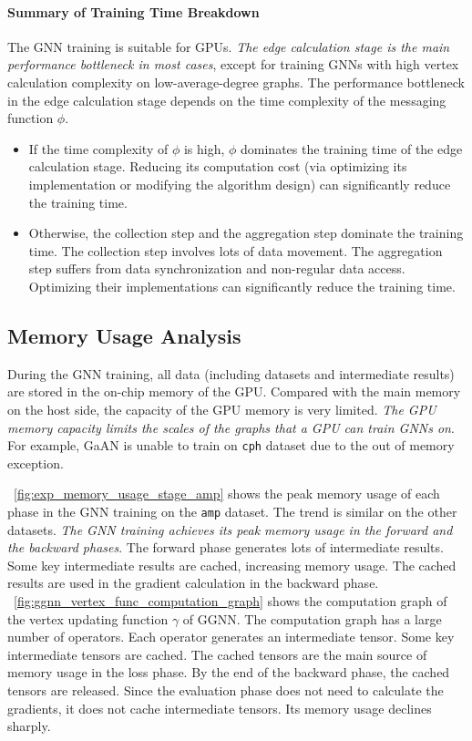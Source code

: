 \paragraph{Summary of Training Time Breakdown}
%
The GNN training is suitable for GPUs.
%
\emph{The edge calculation stage is the main performance bottleneck in most cases}, except for training GNNs with high vertex calculation complexity on low-average-degree graphs.
The performance bottleneck in the edge calculation stage depends on the time complexity of the messaging function $\phi$.
%
\begin{itemize}
    \item If the time complexity of $\phi$ is {high}, {$\phi$} dominates the training time of the edge calculation stage.
    Reducing its computation cost (via optimizing its implementation or modifying the algorithm design) can significantly reduce the training time.
    
    \item Otherwise, the {collection step} and the {aggregation step} dominate the training time.
    The collection step involves lots of data movement.
    The aggregation step suffers from data synchronization and non-regular data access.
    Optimizing their implementations can significantly reduce the training time.
\end{itemize}

\subsection{Memory Usage Analysis}
\label{sec:memory_usage_analysis}

During the GNN training, all data (including datasets and intermediate results) are stored in the on-chip memory of the GPU.
Compared with the main memory on the host side, the capacity of the GPU memory is very limited.
\emph{The GPU memory capacity limits the scales of the graphs that a GPU can train GNNs on}.
For example, GaAN is unable to train on \texttt{cph} dataset due to the out of memory exception.

\figurename~\ref{fig:exp_memory_usage_stage_amp} shows the peak memory usage of each phase in the GNN training on the \texttt{amp} dataset.
The trend is similar on the other datasets.
\emph{The GNN training achieves its peak memory usage in the forward and the backward phases}.
The forward phase generates lots of intermediate results.
Some key intermediate results are cached, increasing memory usage.
The cached results are used in the gradient calculation in the backward phase.
\figurename~\ref{fig:ggnn_vertex_func_computation_graph} shows the computation graph of the vertex updating function $\gamma$ of GGNN.
The computation graph has a large number of operators. Each operator generates an intermediate tensor.
Some key intermediate tensors are cached.
The cached tensors are the main source of memory usage in the loss phase.
By the end of the backward phase, the cached tensors are released.
Since the evaluation phase does not need to calculate the gradients, it does not cache intermediate tensors.
Its memory usage declines sharply.

